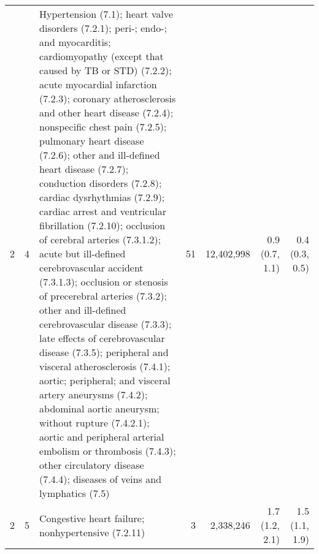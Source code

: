 \begin{tabular}{llp{6.5cm}rrrr}
   2 &  4 & Hypertension (7.1); heart valve disorders (7.2.1); peri-; endo-; and myocarditis; cardiomyopathy (except that caused by TB or STD) (7.2.2); acute myocardial infarction (7.2.3); coronary atherosclerosis and other heart disease (7.2.4); nonspecific chest pain (7.2.5); pulmonary heart disease (7.2.6); other and ill-defined heart disease (7.2.7); conduction disorders (7.2.8); cardiac dysrhythmias (7.2.9); cardiac arrest and ventricular fibrillation (7.2.10); occlusion of cerebral arteries (7.3.1.2); acute but ill-defined cerebrovascular accident (7.3.1.3); occlusion or stenosis of precerebral arteries (7.3.2); other and ill-defined cerebrovascular disease (7.3.3); late effects of cerebrovascular disease (7.3.5); peripheral and visceral atherosclerosis (7.4.1); aortic; peripheral; and visceral artery aneurysms (7.4.2); abdominal aortic aneurysm; without rupture (7.4.2.1); aortic and peripheral arterial embolism or thrombosis (7.4.3); other circulatory disease (7.4.4); diseases of veins and lymphatics (7.5) & 51 & 12,402,998 & 0.9 (0.7, 1.1) & 0.4 (0.3, 0.5) \\ 
   2 &  5 & Congestive heart failure; nonhypertensive (7.2.11) &  3 & 2,338,246 & 1.7 (1.2, 2.1) & 1.5 (1.1, 1.9) \\ 
   \hline
\end{tabular}

